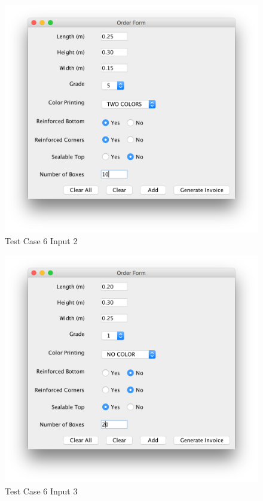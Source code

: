 \documentclass[12pt]{article}
\begin{document}
\begin{figure}[H]
	\includegraphics[width=\linewidth]{./screenshots/test_case_6_order2_input.png}
	\caption{Test Case 6 Input 2}
	\label{test_case_6_input_2}
\end{figure}
\begin{figure}[H]
	\includegraphics[width=\linewidth]{./screenshots/test_case_6_order3_input.png}
	\caption{Test Case 6 Input 3}
	\label{test_case_6_input_3}
\end{figure}
\end{document}
